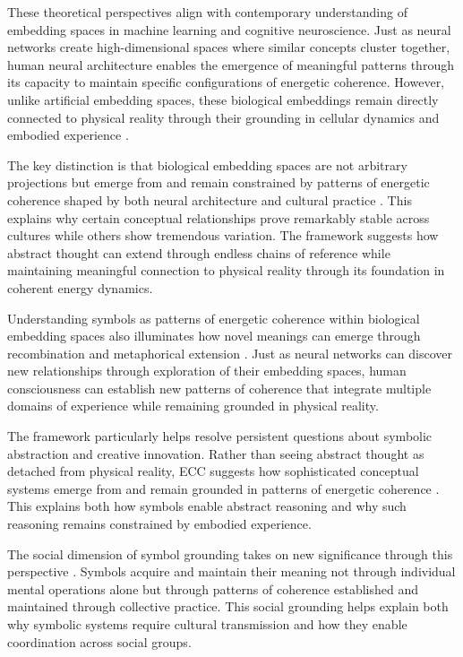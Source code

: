 \begin{refsection}
These theoretical perspectives align with contemporary understanding of embedding spaces in machine learning and cognitive neuroscience. Just as neural networks create high-dimensional spaces where similar concepts cluster together, human neural architecture enables the emergence of meaningful patterns through its capacity to maintain specific configurations of energetic coherence. However, unlike artificial embedding spaces, these biological embeddings remain directly connected to physical reality through their grounding in cellular dynamics and embodied experience \cite{lakoff1999philosophy}.

The key distinction is that biological embedding spaces are not arbitrary projections but emerge from and remain constrained by patterns of energetic coherence shaped by both neural architecture and cultural practice \cite{varela1991embodied}. This explains why certain conceptual relationships prove remarkably stable across cultures while others show tremendous variation. The framework suggests how abstract thought can extend through endless chains of reference while maintaining meaningful connection to physical reality through its foundation in coherent energy dynamics.

Understanding symbols as patterns of energetic coherence within biological embedding spaces also illuminates how novel meanings can emerge through recombination and metaphorical extension \cite{lakoff1999philosophy}. Just as neural networks can discover new relationships through exploration of their embedding spaces, human consciousness can establish new patterns of coherence that integrate multiple domains of experience while remaining grounded in physical reality.

The framework particularly helps resolve persistent questions about symbolic abstraction and creative innovation. Rather than seeing abstract thought as detached from physical reality, ECC suggests how sophisticated conceptual systems emerge from and remain grounded in patterns of energetic coherence \cite{barsalou1999perceptual}. This explains both how symbols enable abstract reasoning and why such reasoning remains constrained by embodied experience.

The social dimension of symbol grounding takes on new significance through this perspective \cite{hutchins1995cognition}. Symbols acquire and maintain their meaning not through individual mental operations alone but through patterns of coherence established and maintained through collective practice. This social grounding helps explain both why symbolic systems require cultural transmission and how they enable coordination across social groups.


\end{refsection}
